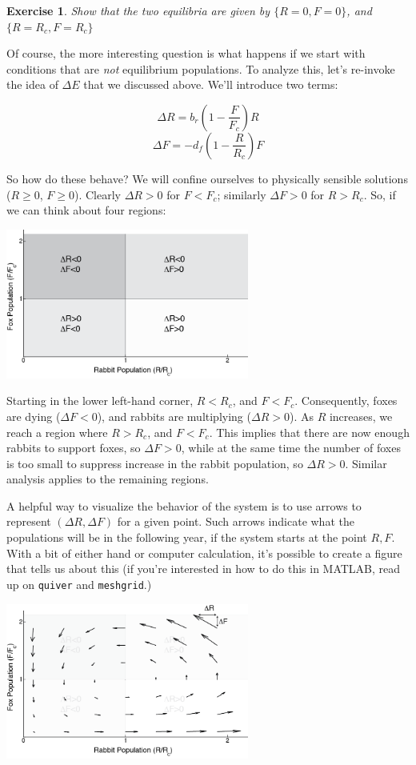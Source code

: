 \documentclass{tufte-handout}
\newtheorem{del}{Exercise}
\newcommand{\beforefig}{\vspace{0.2in}}
\newcommand{\afterfig}{\vspace{0.2in}}
\begin{document}
\begin{del}
Show that the two equilibria are given by  $\{R=0, F=0\} $, and $\{R=R_c, F=R_c\} $ 
\end{del}

Of course, the more interesting question is what happens if we start with conditions that are {\it not} equilibrium populations.  To analyze this, let's re-invoke the idea of $\Delta E$ that we discussed above.  We'll introduce two terms:

$$\Delta R = b_r (1 - \frac{F}{F_c}) R$$
$$\Delta F= - d_f (1-\frac{R}{R_c}) F$$

So how do these behave?  We will confine ourselves to physically sensible solutions ($R\geq 0$, $F\geq 0$).  Clearly $\Delta R >0$ for $F<F_c$; similarly $\Delta F  > 0$ for $R>R_c$.  So, if we can think about four regions:

\beforefig
\centerline{\includegraphics[width=8cm]{figs/FoxRabbitPhasePlaneRegions}}
\afterfig

Starting in the lower left-hand corner, $R<R_c$, and $F<F_c$.  Consequently, foxes are dying ($\Delta F<0$), and rabbits are multiplying ($\Delta R>0$).  As $R$ increases, we reach a region where  $R>R_c$, and $F<F_c$.  This implies that there are now enough rabbits to support foxes, so $\Delta F>0$, while at the same time the number of foxes is too small to suppress increase in the rabbit population, so $\Delta R>0$.  Similar analysis applies to the remaining regions.

A helpful way to visualize the behavior of the system is to use arrows to represent $(\Delta R, \Delta F)$ for a given point.  Such arrows indicate what the populations will be in the following year, if the system starts at the point $R,F$.  With a bit of either hand or computer calculation, it's possible to create a figure that tells us about this (if you're interested in how to do this in MATLAB, read up on {\tt quiver} and {\tt meshgrid}.)

\beforefig
\centerline{
\includegraphics[width=8cm]{figs/FoxRabbitPhasePlaneRegionsWithQuiver.png}}
\afterfig
\end{document}
